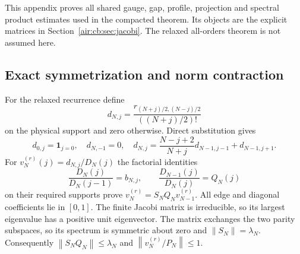 \documentclass[11pt,letterpaper]{article}
\numberwithin{equation}{section}
\theoremstyle{remark}
\newcommand{\norm}[1]{\left\lVert#1\right\rVert}
\begin{document}
This appendix proves all shared gauge, gap, profile, projection and spectral
product estimates used in the compacted theorem. Its objects are the explicit
matrices in Section~\ref{air:cb:sec:jacobi}. The relaxed all-orders theorem is not assumed here.

\subsection{Exact symmetrization and norm contraction}
For the relaxed recurrence define
\[
d_{N,j}=\frac{r_{(N+j)/2,(N-j)/2}}{((N+j)/2)!}
\]
on the physical support and zero otherwise. Direct substitution gives
\begin{equation}\label{air:cb:eq:relaxed-step}
d_{0,j}=\mathbf1_{j=0},\quad d_{N,-1}=0,\quad
d_{N,j}=\frac{N-j+2}{N+j}d_{N-1,j-1}+d_{N-1,j+1}.
\end{equation}
For $v_N^{(r)}(j)=d_{N,j}/D_N(j)$ the factorial identities
\[
\frac{D_N(j)}{D_N(j-1)}=b_{N,j},\qquad
\frac{D_{N-1}(j)}{D_N(j)}=Q_N(j)
\]
on their required supports prove $v_N^{(r)}=S_NQ_Nv_{N-1}^{(r)}$.
All edge and diagonal coefficients lie in $[0,1]$.
The finite Jacobi matrix is irreducible, so its largest eigenvalue has a
positive unit eigenvector. The matrix exchanges the two parity subspaces,
so its spectrum is symmetric about zero and $\norm{S_N}=\lambda_N$.
Consequently $\norm{S_NQ_N}\le\lambda_N$ and
$\norm{v_N^{(r)}/P_N}\le1$.
\end{document}
